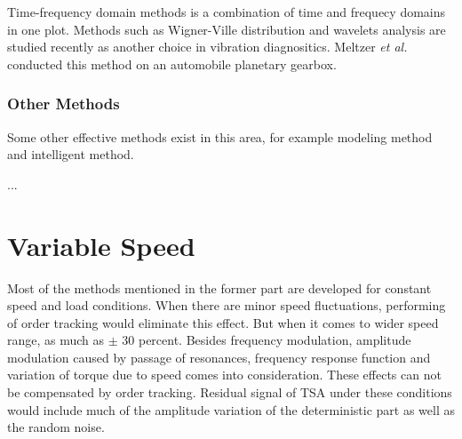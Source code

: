 Time-frequency domain methods is a combination of time and frequecy domains in one plot. Methods such as Wigner-Ville distribution and wavelets analysis are studied recently as another choice in vibration diagnositics. Meltzer \textit{et al.} \cite{mel1} \cite{mel2} conducted this method on an automobile planetary gearbox.

\subsubsection{Other Methods}

Some other effective methods exist in this area, for example modeling method and intelligent method.

...

\section{Variable Speed}

Most of the methods mentioned in the former part are developed for constant speed and load conditions. When there are minor speed fluctuations, performing of order tracking would eliminate this effect. But when it comes to wider speed range, as much as $\pm$ 30 percent. Besides frequency modulation, amplitude modulation caused by passage of resonances, frequency response function and variation of torque due to speed comes into consideration. These effects can not be compensated by order tracking. Residual signal of TSA under these conditions would include much of the amplitude variation of the deterministic part as well as the random noise. \cite{varyspeed}














